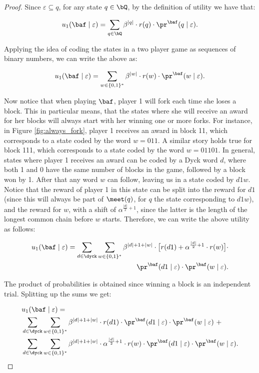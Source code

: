 \begin{proof}
Since $\varepsilon\subseteq q$, for any state $q\in \bQ$, by the definition of utility we have that: 

$$u_1(\baf\mid\varepsilon) = \sum_{q\in \bQ}\beta^{|q|}\cdot r(q)\cdot \pr^{\baf}(q\mid \varepsilon).$$

Applying the idea of coding the states in a two player game as sequences of binary numbers, we can write the above as:

\begin{equation}\label{eq:def_utility}
u_1(\baf\mid\varepsilon) = \sum_{w\in \{0,1\}^*}\beta^{|w|}\cdot r(w)\cdot \pr^{\baf}(w\mid \varepsilon).
\end{equation}


Now notice that when playing $\baf$, player 1 will fork each time she loses a block. This in particular means, that the states where she will receive an award for her blocks will always start with her winning one or more forks. For instance, in Figure \ref{fig:always_fork}, player 1 receives an award in block 11, which corresponds to a state coded by the word $w=011$. A similar story holds true for block 111, which corresponds to a state coded by the word $w=01101$. In general, states where player 1 receives an award can be coded by a Dyck word $d$, where both 1 and 0 have the same number of blocks in the game, followed by a block won by 1. After that any word $w$ can follow, leaving us in a state coded by $d1w$. Notice that the reward of player 1 in this state can be split into the reward for $d1$ (since this will always be part of $\meet(q)$, for $q$ the state corresponding to $d1w$), and the reward for $w$, with a shift of $\alpha^{\frac{|d|}{2}+1}$, since the latter is the length of the longest common chain before $w$ starts. Therefore, we can write the above utility as follows:

\begin{eqnarray*}
u_1(\baf\mid\varepsilon) = \sum_{d\in \dyck}  \sum_{w\in \{0,1\}^*}\beta^{|d|+1+|w|}\cdot \big[r(d1) + \alpha^{\frac{|d|}{2}+1}\cdot r(w)\big] \cdot \\ \pr^{\baf}(d1\mid \varepsilon)\cdot \pr^{\baf}(w\mid \varepsilon).
\end{eqnarray*}

The product of probabilities is obtained since winning a block is an independent trial. Splitting up the sums we get:

\begin{align*}
 & u_1(\baf\mid\varepsilon) = \\
 & \sum_{d\in \dyck}  \sum_{w\in \{0,1\}^*}\beta^{|d|+1+|w|}\cdot r(d1) \cdot \pr^{\baf}(d1\mid \varepsilon)\cdot \pr^{\baf}(w\mid \varepsilon)
 \mbox{ } +\\
 & \sum_{d\in \dyck}  \sum_{w\in \{0,1\}^*}\beta^{|d|+1+|w|}\cdot  \alpha^{\frac{|d|}{2}+1}\cdot r(w) \cdot \pr^{\baf}(d1\mid \varepsilon)\cdot \pr^{\baf}(w\mid \varepsilon).
\end{align*}


\end{proof}
